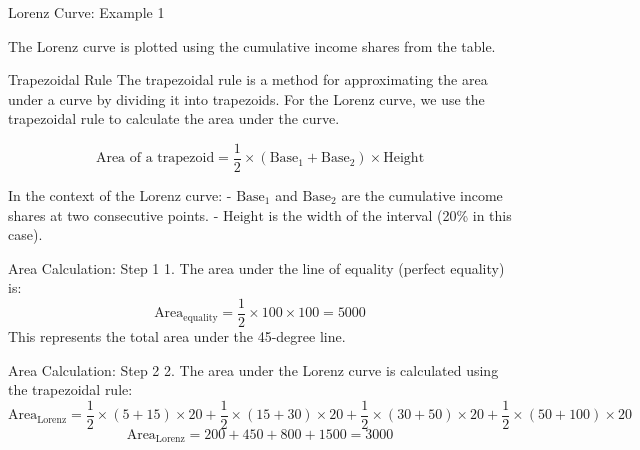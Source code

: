 \documentclass{beamer}
\begin{document}
\begin{frame}{Lorenz Curve: Example 1}

The Lorenz curve is plotted using the cumulative income shares from the table.
\end{frame}

\begin{frame}{Trapezoidal Rule}
The trapezoidal rule is a method for approximating the area under a curve by dividing it into trapezoids. For the Lorenz curve, we use the trapezoidal rule to calculate the area under the curve.

\[
\text{Area of a trapezoid} = \frac{1}{2} \times (\text{Base}_1 + \text{Base}_2) \times \text{Height}
\]

In the context of the Lorenz curve:
- \(\text{Base}_1\) and \(\text{Base}_2\) are the cumulative income shares at two consecutive points.
- \(\text{Height}\) is the width of the interval (20\% in this case).
\end{frame}

\begin{frame}{Area Calculation: Step 1}
1. The area under the line of equality (perfect equality) is:
\[
\text{Area}_{\text{equality}} = \frac{1}{2} \times 100 \times 100 = 5000
\]
This represents the total area under the 45-degree line.
\end{frame}

\begin{frame}{Area Calculation: Step 2}
2. The area under the Lorenz curve is calculated using the trapezoidal rule:
\[
\text{Area}_{\text{Lorenz}} = \frac{1}{2} \times (5 + 15) \times 20 + \frac{1}{2} \times (15 + 30) \times 20 + \frac{1}{2} \times (30 + 50) \times 20 + \frac{1}{2} \times (50 + 100) \times 20
\]
\[
\text{Area}_{\text{Lorenz}} = 200 + 450 + 800 + 1500 = 3000
\]
\end{frame}
\end{document}
